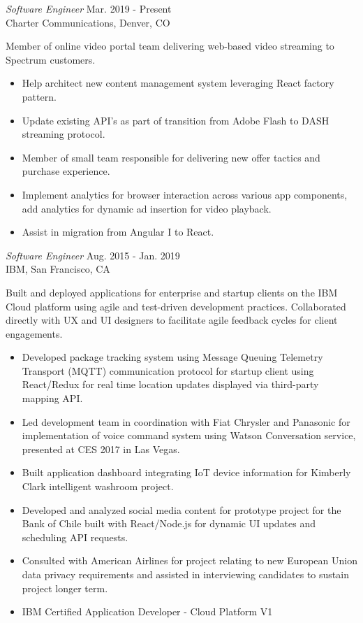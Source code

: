 \documentclass{res}
\begin{document}
\begin{resume}
{\sl Software Engineer} \hfill        Mar. 2019 - Present \\
Charter Communications, Denver, CO
\begin{changemargin}{0.4cm}{0cm} 
Member of online video portal team delivering web-based video streaming to Spectrum customers.
\end{changemargin} 
   \begin{itemize} \itemsep -2pt %
      \item Help architect new content management system leveraging React factory pattern.
      \item Update existing API's as part of transition from Adobe Flash to DASH streaming protocol.
      \item Member of small team responsible for delivering new offer tactics and purchase experience.
      \item Implement analytics for browser interaction across various app components, add analytics for dynamic ad insertion for video playback.
   \item Assist in migration from Angular I to React.
   \end{itemize}

{\sl Software Engineer} \hfill        Aug. 2015 - Jan. 2019 \\
IBM, San Francisco, CA
\begin{changemargin}{0.4cm}{0cm} 
Built and deployed applications for enterprise and startup clients on the IBM Cloud platform using agile and test-driven development practices. Collaborated directly with UX and UI designers to facilitate agile feedback cycles for client engagements.  
\end{changemargin} 
   \begin{itemize} \itemsep -2pt %
   \item Developed package tracking system using Message Queuing Telemetry Transport (MQTT) communication protocol for startup client using React/Redux for real time location updates displayed via third-party mapping API.
   \item Led development team in coordination with Fiat Chrysler and Panasonic for implementation of voice command system using Watson Conversation service, presented at CES 2017 in Las Vegas. 
   \item Built application dashboard integrating IoT device information for Kimberly Clark intelligent washroom project.
   \item Developed and analyzed social media content for prototype project for the Bank of Chile built with React/Node.js for dynamic UI updates and scheduling API requests.
   \item Consulted with American Airlines for project relating to new European Union data privacy requirements and assisted in interviewing candidates to sustain project longer term.
    \item IBM Certified Application Developer - Cloud Platform V1
   \end{itemize}


\end{resume}
\end{document}
